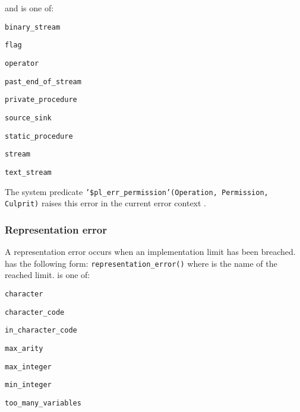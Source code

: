 and  is one of:

\begin{ItemizeThreeCols}

\item \texttt{binary\_stream}

\item \texttt{flag}

\item \texttt{operator}

\item \texttt{past\_end\_of\_stream}

\item \texttt{private\_procedure}

\item \texttt{source\_sink}

\item \texttt{static\_procedure}

\item \texttt{stream}

\item \texttt{text\_stream}

\end{ItemizeThreeCols}

The system predicate \texttt{'\$pl\_err\_permission'(Operation, Permission,
Culprit)} raises this error in the current error context .

\subsubsection{Representation error}
\label{Representation-error}
A representation error occurs when an implementation limit has been
breached.  has the following form:
\texttt{representation\_error()} where 
is the name of the reached limit.  is one of:

\begin{ItemizeThreeCols}

\item \texttt{character}

\item \texttt{character\_code}

\item \texttt{in\_character\_code}

\item \texttt{max\_arity}

\item \texttt{max\_integer}

\item \texttt{min\_integer}

\item \texttt{too\_many\_variables}

\end{ItemizeThreeCols}


